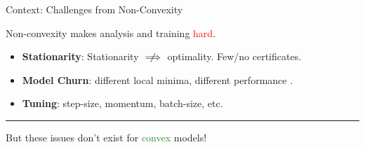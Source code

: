 \documentclass[usenames,dvipsnames,mathserif,notheorems]{beamer}
\newcommand{\horizontalrule}{
	{
			\vspace{-0.5em}
			\center \rule{\textwidth}{0.1em}
			\vspace{-0.2em}
		}
}
\newcommand{\red}[1]{\textcolor{Red}{#1}}
\newcommand{\green}[1]{\textcolor{ForestGreen}{#1}}
\begin{document}
\begin{frame}{Context: Challenges from Non-Convexity}
	\begin{center}
		\Large
		Non-convexity makes analysis and training \red{hard}.
	\end{center}

	\pause
	\begin{itemize}
		\item \textbf{Stationarity}: Stationarity \( \centernot \implies \) optimality.
		      Few/no certificates.

		      \pause
		\item \textbf{Model Churn}: different local minima,
		      different performance \citep{henderson2018deep}.

		      \pause
		\item \textbf{Tuning}: step-size, momentum, batch-size, etc.
	\end{itemize}

	\pause
	\horizontalrule

	\vspace{-2ex}

	\begin{center}
		\Large
		But these issues don't exist for \green{convex} models!
	\end{center}

	\pause



\end{frame}
\end{document}
